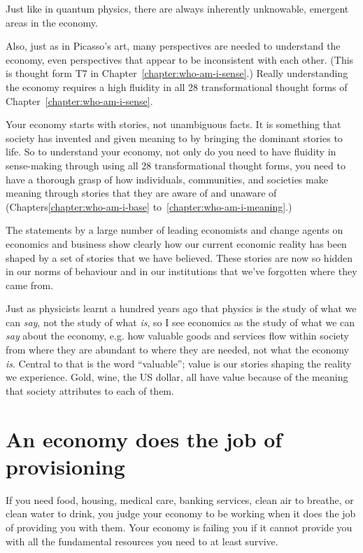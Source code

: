 Just like in quantum physics, there are always inherently unknowable, emergent areas in the economy.


Also, just as in Picasso's art, many perspectives are needed to understand the economy, even perspectives that appear to be inconsistent with each other. (This is thought form T7 in Chapter~\ref{chapter:who-am-i-sense}.) Really understanding the economy requires a high fluidity in all 28 transformational thought forms  of Chapter~\ref{chapter:who-am-i-sense}.


Your economy starts with stories, not unambiguous facts. It is something that society has invented and given meaning to by bringing the dominant stories to life. So to understand your economy, not only do you need to have fluidity in sense-making through using all 28 transformational thought forms, you need to have a thorough grasp of how individuals, communities, and societies make meaning through stories that they are aware of and unaware of (Chapters\ref{chapter:who-am-i-base} to~\ref{chapter:who-am-i-meaning}.)


The statements by a large number of leading economists and change agents on economics and business\cite{veldman-modern-economics,veldman-modern-law} show clearly how our current economic reality has been shaped by a set of stories that we have believed. These stories are now so hidden in our norms of behaviour and in our institutions that we've forgotten where they came from. 


Just as physicists learnt a hundred years ago that physics is the study of what we can \emph{say}, not the study of what \emph{is}, so I see economics as the study of what we can \emph{say} about the economy, e.g. how valuable goods and services flow within society from where they are abundant to where they are needed, not what the economy \emph{is}. Central to that is the word “valuable”; value is our stories shaping the reality we experience. Gold, wine, the US dollar, all have value because of the meaning that society attributes to each of them.






\section{An economy does the job of provisioning}
\label{section:economy-provisioning}
If you need food, housing, medical care, banking services, clean air to breathe, or clean water to drink, you judge your economy to be working when it does the job of providing you with them. Your economy is failing you if it cannot provide you with all the fundamental resources you need to at least survive.


